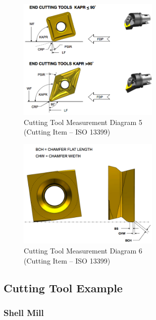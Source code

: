 \begin{figure}[ht]
  \centering
  \includegraphics[width=0.6\textwidth]{figures/a5-cutting-item-measurement-diagram-5.png}
  \caption{Cutting Tool Measurement Diagram 5
  \\  (Cutting Item – ISO 13399)}
  \label{fig:a5-cutting-item-measurement-diagram-5}
\end{figure}
\FloatBarrier

\begin{figure}[ht]
  \centering
  \includegraphics[width=0.6\textwidth]{figures/a6-cutting-item-measurement-diagram-6.png}
  \caption{Cutting Tool Measurement Diagram 6
  \\  (Cutting Item – ISO 13399)}
  \label{fig:a6-cutting-item-measurement-diagram-6}
\end{figure}
\FloatBarrier

\pagebreak

\subsection{Cutting Tool Example}

\subsubsection{Shell Mill}


